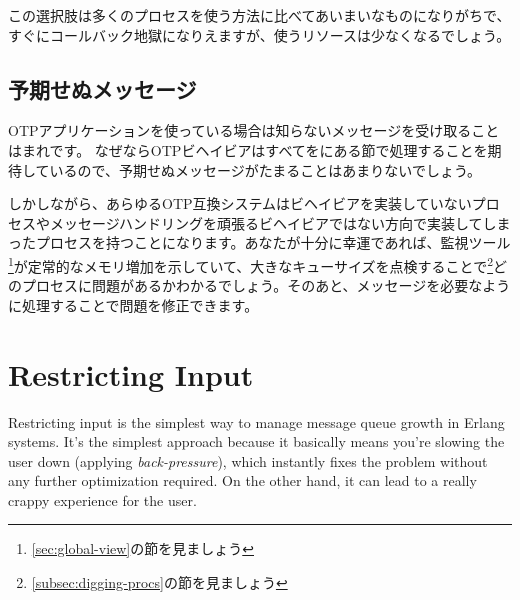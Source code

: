 この選択肢は多くのプロセスを使う方法に比べてあいまいなものになりがちで、すぐにコールバック地獄になりえますが、使うリソースは少なくなるでしょう。

\subsection{予期せぬメッセージ}

OTPアプリケーションを使っている場合は知らないメッセージを受け取ることはまれです。
なぜならOTPビヘイビアはすべてをにある節で処理することを期待しているので、予期せぬメッセージがたまることはあまりないでしょう。

しかしながら、あらゆるOTP互換システムはビヘイビアを実装していないプロセスやメッセージハンドリングを頑張るビヘイビアではない方向で実装してしまったプロセスを持つことになります。あなたが十分に幸運であれば、監視ツール\footnote{\ref{sec:global-view}の節を見ましょう}が定常的なメモリ増加を示していて、大きなキューサイズを点検することで\footnote{\ref{subsec:digging-procs}の節を見ましょう}どのプロセスに問題があるかわかるでしょう。そのあと、メッセージを必要なように処理することで問題を修正できます。

\section{Restricting Input}

Restricting input is the simplest way to manage message queue growth in Erlang systems. It's the simplest approach because it basically means you're slowing the user down (applying \emph{back-pressure}), which instantly fixes the problem without any further optimization required. On the other hand, it can lead to a really crappy experience for the user.

